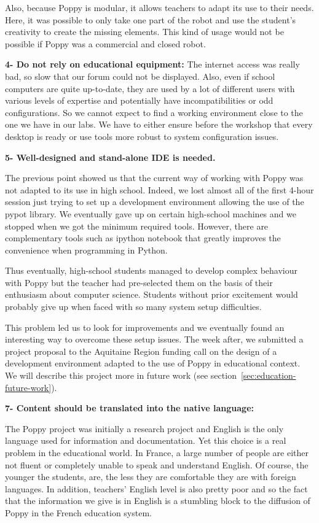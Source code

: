 Also, because Poppy is modular, it allows teachers to adapt its use to their needs. Here, it was possible to only take one part of the robot and use the student’s creativity to create the missing elements. This kind of usage would not be possible if Poppy was a commercial and closed robot.

\textbf{4- Do not rely on educational equipment:}
The internet access was really bad, so slow that our forum could not be displayed. Also, even if school computers are quite up-to-date, they are used by a lot of different users with various levels of expertise and potentially have incompatibilities or odd configurations. So we cannot expect to find a working environment close to the one we have in our labs.
We have to either ensure before the workshop that every desktop is ready or use tools more robust to system configuration issues.

\textbf{5- Well-designed and stand-alone IDE is needed.}

The previous point showed us that the current way of working with Poppy was not adapted to its use in high school. Indeed, we lost almost all of the first 4-hour session just trying to set up a development environment allowing the use of the pypot library. We eventually gave up on certain high-school machines and we stopped when we got the minimum required tools. However, there are complementary tools such as ipython notebook that greatly improves the convenience when programming in Python.

Thus eventually, high-school students managed to develop complex behaviour with Poppy but the teacher had pre-selected them on the basis of their enthusiasm about computer science. Students without prior excitement would probably give up when faced with so many system setup difficulties.

This problem led us to look for improvements and we eventually found an interesting way to overcome these setup issues. The week after, we submitted a project proposal to the Aquitaine Region funding call on the design of a development environment adapted to the use of Poppy in educational context. We will describe this project more in future work (see section~\ref{sec:education-future-work}).


\textbf{7- Content should be translated into the native language:}

The Poppy project was initially a research project and English is the only language used for information and documentation. Yet this choice is a real problem in the educational world. In France, a large number of people are either not fluent or completely unable to speak and understand English. Of course, the younger the students,  are, the less they are comfortable they are with foreign languages. In addition, teachers’ English level is also pretty poor and so the fact that the information we give is in English is a stumbling block to the diffusion of Poppy in the French education system.



